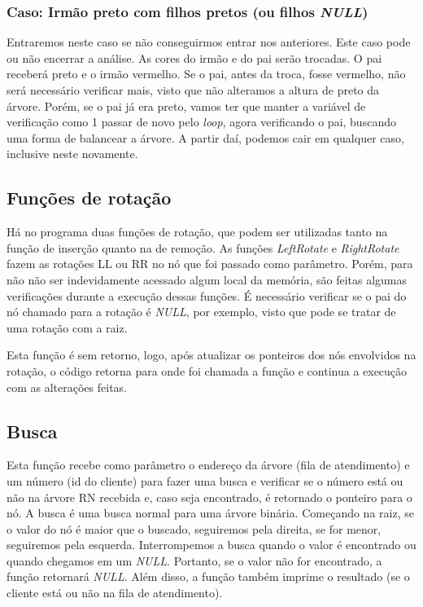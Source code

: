 \documentclass[a4paper,11pt]{article}
\begin{document}
    \subsubsection{Caso: Irmão preto com filhos pretos (ou filhos \textit{NULL})}
        Entraremos neste caso se não conseguirmos entrar nos anteriores. Este caso pode ou não encerrar a análise. As cores do irmão e do pai serão trocadas. O pai receberá preto e o irmão vermelho. Se o pai, antes da troca, fosse vermelho, não será necessário verificar mais, visto que não alteramos a altura de preto da árvore. Porém, se o pai já era preto, vamos ter que manter a variável de verificação como 1 passar de novo pelo \textit{loop}, agora verificando o pai, buscando uma forma de balancear a árvore. A partir daí, podemos cair em qualquer caso, inclusive neste novamente.
        
\medskip
\subsection{Funções de rotação}
    Há no programa duas funções de rotação, que podem ser utilizadas tanto na função de inserção quanto na de remoção. As funções \textit{LeftRotate} e \textit{RightRotate} fazem as rotações LL ou RR no nó que foi passado como parâmetro. Porém, para não não ser indevidamente acessado algum local da memória, são feitas algumas verificações durante a execução dessas funções. É necessário verificar se o pai do nó chamado para a rotação é \textit{NULL}, por exemplo, visto que pode se tratar de uma rotação com a raiz.
    
    Esta função é sem retorno, logo, após atualizar os ponteiros dos nós envolvidos na rotação, o código retorna para onde foi chamada a função e continua a execução com as alterações feitas.
    
\subsection{Busca}
    Esta função recebe como parâmetro o endereço da árvore (fila de atendimento) e um número (id do cliente) para fazer uma busca e verificar se o número está ou não na árvore RN recebida e, caso seja encontrado, é retornado o ponteiro para o nó. A busca é uma busca normal para uma árvore binária. Começando na raiz, se o valor do nó é maior que o buscado, seguiremos pela direita, se for menor, seguiremos pela esquerda. Interrompemos a busca quando o valor é encontrado ou quando chegamos em um \textit{NULL}. Portanto, se o valor não for encontrado, a função retornará \textit{NULL}. Além disso, a função também imprime o resultado (se o cliente está ou não na fila de atendimento).
    
\end{document}
